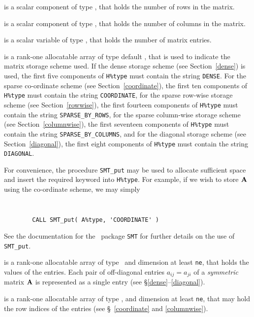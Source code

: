 \documentclass{galahad}
\begin{document}
\begin{description}

 is a scalar component of type \integer, 
that holds the number of rows in the matrix. 
 
 is a scalar component of type \integer, 
that holds the number of columns in the matrix. 
 
 is a scalar variable of type \integer, that
holds the number of matrix entries.

 is a rank-one allocatable array of type default \character, that
is used to indicate the matrix storage scheme used.  If the dense storage scheme 
(see Section~\ref{dense}) is used, 
the first five components of {\tt H\%type} must contain the
string {\tt DENSE}.
For the sparse co-ordinate scheme (see Section~\ref{coordinate}), 
the first ten components of {\tt H\%type} must contain the
string {\tt COORDINATE},  
for the sparse row-wise storage scheme (see Section~\ref{rowwise}),
the first fourteen components of {\tt H\%type} must contain the
string {\tt SPARSE\_BY\_ROWS},
for the sparse column-wise storage scheme (see Section~\ref{columnwise}),
the first seventeen components of {\tt H\%type} must contain the
string {\tt SPARSE\_BY\_COLUMNS},
and for the diagonal storage scheme (see Section~\ref{diagonal}),
the first eight components of {\tt H\%type} must contain the
string {\tt DIAGONAL}.

For convenience, the procedure {\tt SMT\_put} 
may be used to allocate sufficient space and insert the required keyword
into {\tt H\%type}.
For example, if we wish to store ${\mathbf{A}}$ using the co-ordinate scheme,
we may simply
{\tt 
\begin{verbatim}
        CALL SMT_put( A%type, 'COORDINATE' )
\end{verbatim}
}
\noindent
See the documentation for the \galahad\ package {\tt SMT} 
for further details on the use of {\tt SMT\_put}. 

 is a rank-one allocatable array of type \realdp\, 
and dimension at least {\tt ne}, that holds the values of the entries. 
Each pair of off-diagonal entries $a_{ij} = a_{ji}$ of a {\em symmetric}
matrix ${\mathbf{A}}$ is represented as a single entry 
(see \S\ref{dense}--\ref{diagonal}).

 is a rank-one allocatable array of type \integer, 
and dimension at least {\tt ne}, that may hold the row indices of the entries 
(see \S~\ref{coordinate} and \ref{columnwise}).


\end{description}
\end{document}
